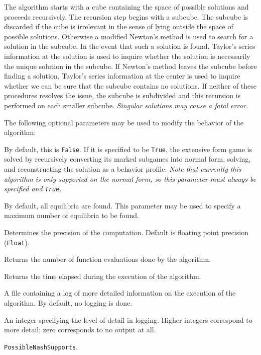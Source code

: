 The algorithm starts with a cube containing the space of possible
solutions and proceeds recursively.  The recursion step begins with a
subcube.  The subcube is discarded if the cube is irrelevant in the
sense of lying outside the space of possible solutions.  Otherwise a
modified Newton's method is used to search for a solution in the
subcube.  In the event that such a solution is found, Taylor's series
information at the solution is used to inquire whether the solution is
necessarily the unique solution in the subcube.  If Newton's method
leaves the subcube before finding a solution, Taylor's series
information at the center is used to inquire whether we can be sure
that the subcube contains no solutions.  If neither of these
procedures resolves the issue, the subcube is subdivided and this
recursion is performed on each smaller subcube.  {\it Singular
solutions may cause a fatal error.}

The following optional parameters may be used to modify the behavior
of the algorithm:
\bd
\item
[asNfg:] By default, this is \verb+False+.  If it is specified to be
\verb+True+, the extensive form game is solved by recursively converting
its marked subgames into normal form, solving, and reconstructing the
solution as a behavior profile.  {\it Note that currently this algorithm
is only supported on the normal form, so this parameter
must always be specified and {\tt True}.} 
\item
[stopAfter:] By default, all equilibria are found.  This parameter may
be used to specify a maximum number of equilibria to be found.
\item
[precision:] Determines the precision of the computation. Default is
floating point precision (\verb+Float+). 
\item
[nEvals:] Returns the number of function evaluations done by the
algorithm.
\item
[time:] Returns the time elapsed during the execution
of the algorithm.
\item
[traceFile:] A file containing a log of more detailed information on the
execution of the algorithm.  By default, no logging is done.
\item
[traceLevel:] An integer specifying the level of detail in logging.
Higher integers correspond to more detail; zero corresponds to no output
at all.
\ed
\item [See also:] \verb+PossibleNashSupports+.
\ed



